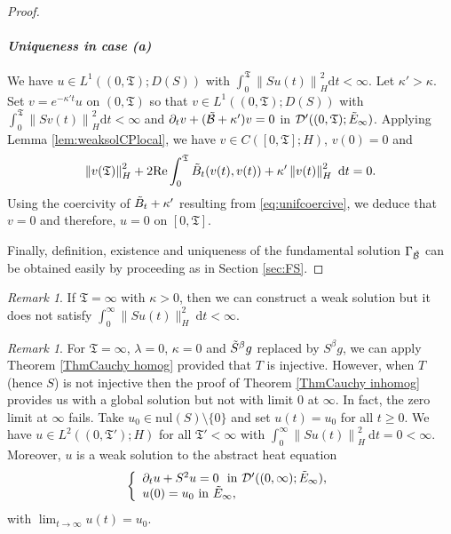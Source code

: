\documentclass[11pt, letterpaper]{amsart}
\theoremstyle{definition}
\theoremstyle{remark}
\newtheorem{rem}[thm]{Remark}
\numberwithin{equation}{section}
\begin{document}
\begin{proof}
\paragraph{\textit{Uniqueness in case (a) }}
We have $u \in L^1((0,\mathfrak{T});D(S))$ with $\int_{0}^{\mathfrak{T}} \left\|Su(t) \right\|_H^2 \mathrm d t <\infty$. Let $\kappa'>\kappa$. Set $v = e^{-\kappa' t}u$ on $(0,\mathfrak{T})$ so that $v \in L^1((0,\mathfrak{T});D(S))$ with $\int_{0}^{\mathfrak{T}} \left\|Sv(t) \right\|_H^2 \mathrm d t <\infty$ and $\partial_t v + (\Tilde{\mathcal{B}}+\kappa') v =0$ in $\mathcal{D}'((0,\mathfrak{T});\Tilde{E}_\infty)$.  Applying Lemma \ref{lem:weaksolCPlocal}, we have $v \in C([0,\mathfrak{T}]; H)$, $v(0)=0$ and  
 \begin{equation*}
  \left \| v(\mathfrak{T}) \right \|^2_H +  2\mathrm{Re}\int_{0}^{\mathfrak{T}}  \Tilde{B}_t(v(t),v(t)) + \kappa' \left \| v(t) \right \|^2_H \ \mathrm dt=  0.
 \end{equation*}
Using the coercivity of $\Tilde{B}_t+\kappa'$ resulting from \eqref{eq:unifcoercive}, we deduce that $v=0$ and therefore, $u=0$ on $[0,\mathfrak{T}]$.

Finally, definition, existence and uniqueness of the fundamental solution $\Gamma_{\Tilde{\mathcal{B}}}$ can be obtained easily by proceeding as in Section \ref{sec:FS}.
\end{proof}
\begin{rem}\label{rem:tinfty,k>0}
    If $\mathfrak{T}=\infty$ with $\kappa> 0$, then we can construct a weak solution but it does not satisfy $\int_{0}^{\infty} \|Su(t) \|_H^2 \ \mathrm d t <\infty$.
\end{rem}

\begin{rem}\label{rem : cas dégénéré}
For $\mathfrak{T}=\infty$, $\lambda=0$, $\kappa=0$ and $\Tilde{S}^\beta g$ replaced by $S^\beta g$,  we can apply Theorem \ref{ThmCauchy homog} provided that $T$ is injective. However, when $T$ (hence $S$) is not injective then the proof of  Theorem \ref{ThmCauchy inhomog} provides us with a global solution but not with limit 0 at $\infty$. In fact, the zero limit at $\infty$ fails. Take $u_0 \in \mathrm{nul}(S) \setminus \{0\}$ and set $u(t)=u_0$ for all $t \ge 0$. We have $u \in L^2((0,\mathfrak{T}');H)$ for all $\mathfrak{T'}<\infty$ with $\int_{0}^{\infty} \left\|Su(t) \right\|_H^2 \ \mathrm d t =0 <\infty$. Moreover, $u$ is a weak solution to the abstract heat equation 
\begin{align*}
\left\{
    \begin{array}{ll}
        \partial_t u + S^2u = 0  \ \ \mathrm{in}\ \mathcal{D}'((0,\infty); \Tilde{E}_\infty), \\
        u(0)=u_0 \  \mathrm{in} \ \Tilde{E}_\infty,
    \end{array}
\right.
\end{align*}
with $\lim_{t\rightarrow\infty}u(t)=u_0$.
\end{rem}
\end{document}
